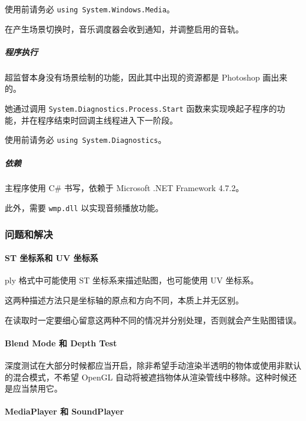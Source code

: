 \documentclass[
]{article}
\begin{document}
使用前请务必 \texttt{using\ System.Windows.Media}。

在产生场景切换时，音乐调度器会收到通知，并调整启用的音轨。

\hypertarget{header-n330}{%
\subparagraph{程序执行}\label{header-n330}}

超监督本身没有场景绘制的功能，因此其中出现的资源都是 Photoshop
画出来的。

她通过调用 \texttt{System.Diagnostics.Process.Start}
函数来实现唤起子程序的功能，并在程序结束时回调主线程进入下一阶段。

使用前请务必 \texttt{using\ System.Diagnostics}。

\hypertarget{header-n724}{%
\subparagraph{依赖}\label{header-n724}}

主程序使用 C\# 书写，依赖于 Microsoft .NET Framework 4.7.2。

此外，需要 \texttt{wmp.dll} 以实现音频播放功能。

\hypertarget{header-n342}{%
\subsubsection{问题和解决}\label{header-n342}}

\hypertarget{header-n346}{%
\paragraph{ST 坐标系和 UV 坐标系}\label{header-n346}}

ply 格式中可能使用 ST 坐标系来描述贴图，也可能使用 UV 坐标系。

这两种描述方法只是坐标轴的原点和方向不同，本质上并无区别。

在读取时一定要细心留意这两种不同的情况并分别处理，否则就会产生贴图错误。

\hypertarget{header-n351}{%
\paragraph{Blend Mode 和 Depth Test}\label{header-n351}}

深度测试在大部分时候都应当开启，除非希望手动渲染半透明的物体或使用非默认的混合模式，不希望
OpenGL 自动将被遮挡物体从渲染管线中移除。这种时候还是应当禁用它。

\hypertarget{header-n357}{%
\paragraph{MediaPlayer 和 SoundPlayer}\label{header-n357}}
\end{document}
